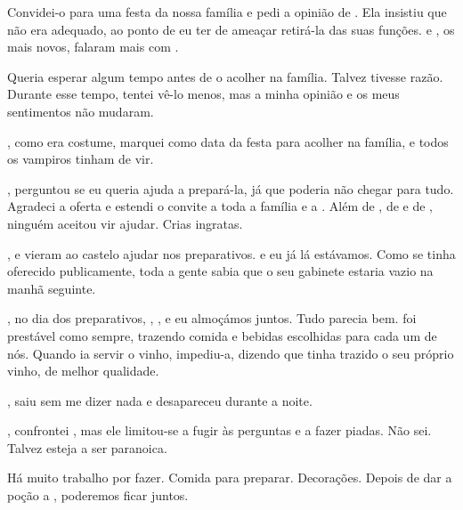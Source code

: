 {Convidei-o para uma festa da nossa família e pedi a opinião de . Ela insistiu que não era adequado, ao ponto de eu ter de ameaçar retirá-la das suas funções.  e , os mais novos, falaram mais com .

Queria esperar algum tempo antes de o acolher na família. Talvez  tivesse razão. Durante esse tempo, tentei vê-lo menos, mas a minha opinião e os meus sentimentos não mudaram.

, como era costume, marquei  como data da festa para acolher  na família, e todos os vampiros tinham de vir.

,  perguntou se eu queria ajuda a prepará-la, já que  poderia não chegar para tudo. Agradeci a oferta e estendi o convite a toda a família e a . Além de , de  e de , ninguém aceitou vir ajudar. Crias ingratas.

,  e  vieram ao castelo ajudar nos preparativos.  e eu já lá estávamos. Como  se tinha oferecido publicamente, toda a gente sabia que o seu gabinete estaria vazio na manhã seguinte.

, no dia dos preparativos, , ,  e eu almoçámos juntos. Tudo parecia bem.  foi prestável como sempre, trazendo comida e bebidas escolhidas para cada um de nós. Quando  ia servir o vinho,  impediu-a, dizendo que tinha trazido o seu próprio vinho, de melhor qualidade.

,  saiu sem me dizer nada e desapareceu durante a noite.

, confrontei , mas ele limitou-se a fugir às perguntas e a fazer piadas. Não sei. Talvez esteja a ser paranoica.

Há muito trabalho por fazer. Comida para preparar. Decorações. Depois de dar a poção a , poderemos ficar juntos.

}
